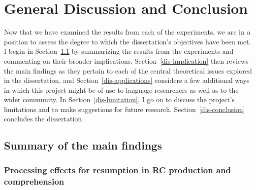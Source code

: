 

\chapter{General Discussion and Conclusion}\label{ch-discussion}

Now that we have examined the results from each of the experiments, we are in a position to assess the degree to which the dissertation's objectives have been met. I begin in Section~\ref{dis-summary} by summarizing the results from the experiments and commenting on their broader implications. Section~\ref{dis-implication} then reviews the main findings as they pertain to each of the central theoretical issues explored in the dissertation, and Section~\ref{dis-applications} considers a few additional ways in which this project might be of use to language researchers as well as to the wider community. In Section~\ref{dis-limitation}, I go on to discuss the project's limitations and to make suggestions for future research. Section~\ref{dis-conclusion} concludes the dissertation.

\section{Summary of the main findings}\label{dis-summary}

\subsection{Processing effects for resumption in RC production and comprehension}\label{dis-processing}

